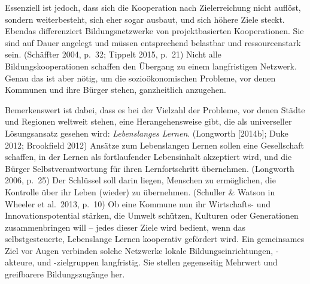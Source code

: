 \documentclass[a4paper,
fontsize=11pt,
oneside,
numbers=noperiodatend,
parskip=half-,
bibliography=totoc,
final
]{scrartcl}
\begin{document}
Essenziell ist jedoch, dass sich die Kooperation nach Zielerreichung
nicht auflöst, sondern weiterbesteht, sich eher sogar ausbaut, und sich
höhere Ziele steckt. Ebendas differenziert Bildungsnetzwerke von
projektbasierten Kooperationen. Sie sind auf Dauer angelegt und müssen
entsprechend belastbar und ressourcenstark sein. (Schäffter 2004, p.~32;
Tippelt 2015, p.~21) Nicht alle Bildungskooperationen schaffen den
Übergang zu einem langfristigen Netzwerk. Genau das ist aber nötig, um
die sozioökonomischen Probleme, vor denen Kommunen und ihre Bürger
stehen, ganzheitlich anzugehen.

Bemerkenswert ist dabei, dass es bei der Vielzahl der Probleme, vor
denen Städte und Regionen weltweit stehen, eine Herangehensweise gibt,
die als universeller Lösungsansatz gesehen wird: \emph{Lebenslanges
Lernen}. (Longworth {[}2014b{]}; Duke 2012; Brookfield 2012) Ansätze zum
Lebenslangen Lernen sollen eine Gesellschaft schaffen, in der Lernen als
fortlaufender Lebensinhalt akzeptiert wird, und die Bürger
Selbstverantwortung für ihren Lernfortschritt übernehmen. (Longworth
2006, p.~25) Der Schlüssel soll darin liegen, Menschen zu ermöglichen,
die Kontrolle über ihr Leben (wieder) zu übernehmen. (Schuller \& Watson
in Wheeler et al.~2013, p.~10) Ob eine Kommune nun ihr Wirtschafts- und
Innovationspotential stärken, die Umwelt schützen, Kulturen oder
Generationen zusammenbringen will -- jedes dieser Ziele wird bedient,
wenn das selbstgesteuerte, Lebenslange Lernen kooperativ gefördert wird.
Ein gemeinsames Ziel vor Augen verbinden solche Netzwerke lokale
Bildungseinrichtungen, -akteure, und -zielgruppen langfristig. Sie
stellen gegenseitig Mehrwert und greifbarere Bildungszugänge her.
\end{document}
